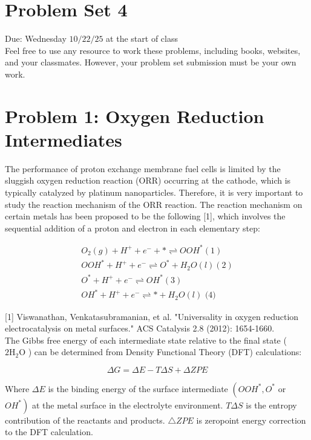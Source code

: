 \documentclass[12pt]{article}
\begin{document}
\section*{Problem Set 4}
Due: Wednesday $10 / 22 / 25$ at the start of class\\
Feel free to use any resource to work these problems, including books, websites, and your classmates. However, your problem set submission must be your own work.

\section{Problem 1: Oxygen Reduction Intermediates}
The performance of proton exchange membrane fuel cells is limited by the sluggish oxygen reduction reaction (ORR) occurring at the cathode, which is typically catalyzed by platinum nanoparticles. Therefore, it is very important to study the reaction mechanism of the ORR reaction. The reaction mechanism on certain metals has been proposed to be the following [1], which involves the sequential addition of a proton and electron in each elementary step:


\begin{gather*}
O_{2}(g)+H^{+}+e^{-}+* \rightleftharpoons O O H^{*}(1)  \tag{1}\\
O O H^{*}+H^{+}+e^{-} \rightleftharpoons O^{*}+H_{2} O(l)(2) \\
O^{*}+H^{+}+e^{-} \rightleftharpoons O H^{*}(3) \\
O H^{*}+H^{+}+e^{-} \rightleftharpoons *+H_{2} O(l) \text { (4) } \tag{4}
\end{gather*}


[1] Viswanathan, Venkatasubramanian, et al. "Universality in oxygen reduction electrocatalysis on metal surfaces." ACS Catalysis 2.8 (2012): 1654-1660.\\
The Gibbs free energy of each intermediate state relative to the final state ( $2 \mathrm{H}_{2} \mathrm{O}$ ) can be determined from Density Functional Theory (DFT) calculations:

$$
\Delta G=\Delta E-T \Delta S+\Delta Z P E
$$

Where $\Delta E$ is the binding energy of the surface intermediate $\left(O O H^{*}, O^{*}\right.$ or $\left.O H^{*}\right)$ at the metal surface in the electrolyte environment. $T \Delta S$ is the entropy contribution of the reactants and products. $\triangle Z P E$ is zeropoint energy correction to the DFT calculation.
\end{document}
